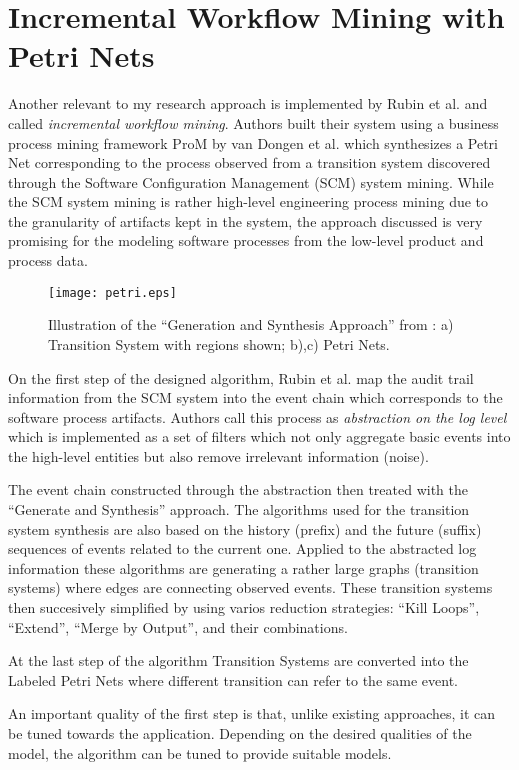 \section{Incremental Workflow Mining with Petri Nets}
Another relevant to my research approach is implemented by Rubin et al. \cite{citeulike:1885717} and called \textit{incremental workflow mining}. Authors built their system using a business process mining framework ProM by van Dongen et al. \cite{citeulike:5043673} which synthesizes a Petri Net corresponding to the process observed from a transition system discovered through the Software Configuration Management (SCM) system mining. While the SCM system mining is rather high-level engineering process mining due to the granularity of artifacts kept in the system, the approach discussed is very promising for the modeling software processes from the low-level product and process data.

\begin{figure}[tbp]
   \centering
   \texttt{[image: petri.eps]}
   \caption{Illustration of the ``Generation and Synthesis Approach'' from \cite{citeulike:5043673}: a) Transition System with regions shown; b),c) Petri Nets.}
   \label{fig:petri}
\end{figure}

On the first step of the designed algorithm, Rubin et al. map the audit trail information from the SCM system into the event chain which corresponds to the software process artifacts. Authors call this process as \textit{abstraction on the log level} which is implemented as a set of filters which not only aggregate basic events into the high-level entities but also remove irrelevant information (noise). 

The event chain constructed through the abstraction then treated with the ``Generate and Synthesis'' \cite{citeulike:3718014} approach. The algorithms used for the transition system synthesis are also based on the history (prefix) and the future (suffix) sequences of events related to the current one. Applied to the abstracted log information these algorithms are generating a rather large graphs (transition systems) where edges are connecting observed events. These transition systems then succesively simplified by using varios reduction strategies: ``Kill Loops'', ``Extend'', ``Merge by Output'', and their combinations.

At the last step of the algorithm Transition Systems are converted into the Labeled Petri Nets where different transition can refer to the same event.




An
important quality of the first step is that, unlike existing approaches, it can be
tuned towards the application. Depending on the desired qualities of the model,
the algorithm can be tuned to provide suitable models.